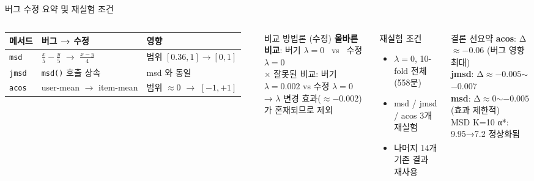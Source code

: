 \documentclass[aspectratio=169,10pt]{beamer}
\begin{document}
\begin{frame}[shrink=8]{버그 수정 요약 및 재실험 조건}
	\begin{columns}[T]
			\renewcommand{\arraystretch}{1.3}
			\begin{tabular}{l|p{3.4cm}|p{2.8cm}}
				\toprule
				\textbf{메서드} & \textbf{버그 → 수정} & \textbf{영향} \\
				\midrule
				\texttt{msd}
				  & $\tfrac{x}{5}-\tfrac{y}{5}$ $\to$ $\tfrac{x-y}{4}$
				  & 범위 $[0.36,1]$$\to$$[0,1]$ \\
				\texttt{jmsd}
				  & \texttt{msd()} 호출 상속
				  & msd 와 동일 \\
				\texttt{acos}
				  & user-mean $\to$ item-mean
				  & 범위 $\approx\!0$ $\to$ $[-1,+1]$ \\
				\bottomrule
			\end{tabular}

			\vspace{0.4em}
			\begin{block}{비교 방법론 (수정)}
				\small
				\textbf{올바른 비교}: 버기 $\lambda=0$ \ vs \ 수정 $\lambda=0$\\
				\textcolor{negred}{$\times$ 잘못된 비교}: 버기 $\lambda=0.002$ vs 수정 $\lambda=0$\\
				\small → $\lambda$ 변경 효과($\approx-0.002$)가 혼재되므로 제외
			\end{block}

			\begin{alertblock}{재실험 조건}
				\begin{itemize}
					\item $\lambda = 0$, 10-fold 전체 (558분)
					\item msd / jmsd / acos 3개 재실험
					\item 나머지 14개 기존 결과 재사용
				\end{itemize}
			\end{alertblock}
			\begin{block}{결론 선요약}
				\small
				\textbf{acos}: Δ$\approx-0.06$ (버그 영향 최대)\\
				\textbf{jmsd}: Δ$\approx-0.005$$\sim$$-0.007$\\
				\textbf{msd}: Δ$\approx$0$\sim$$-0.005$ (효과 제한적)\\
				\small \textcolor{negred}{MSD K=10 α*: 9.95→7.2 정상화됨}
			\end{block}
	\end{columns}
\end{frame}
\end{document}
